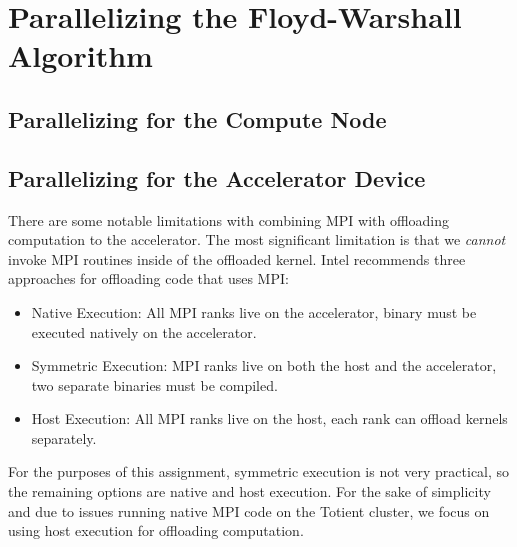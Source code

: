 
\section{Parallelizing the Floyd-Warshall Algorithm}
\label{sec-parallel}

\subsection{Parallelizing for the Compute Node}
\label{sec-parallel-node}



\subsection{Parallelizing for the Accelerator Device}
\label{sec-parallel-device}

There are some notable limitations with combining MPI with offloading
computation to the accelerator. The most significant limitation is that
we \emph{cannot} invoke MPI routines inside of the offloaded
kernel. Intel recommends three approaches for offloading code that uses
MPI:

\begin{itemize}
  \item Native Execution: All MPI ranks live on the accelerator, binary
    must be executed natively on the accelerator.
  \item Symmetric Execution: MPI ranks live on both the host and the
    accelerator, two separate binaries must be compiled.
  \item Host Execution: All MPI ranks live on the host, each rank can
    offload kernels separately.
\end{itemize}

For the purposes of this assignment, symmetric execution is not very
practical, so the remaining options are native and host execution. For
the sake of simplicity and due to issues running native MPI code on the
Totient cluster, we focus on using host execution for offloading
computation.

